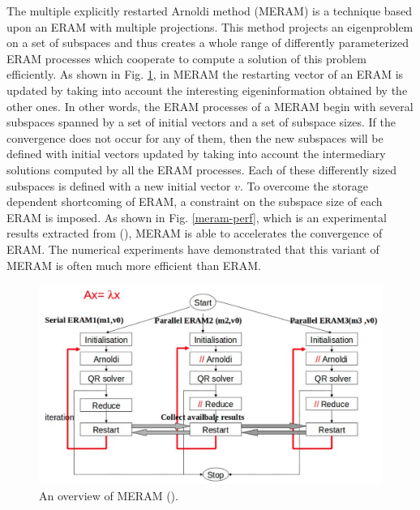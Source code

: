 The multiple explicitly restarted Arnoldi method (MERAM) is a technique based upon an ERAM with multiple projections. This method projects an eigenproblem on a set of subspaces and thus creates a whole range of differently parameterized ERAM processes which cooperate to compute a solution of this problem efficiently. As shown in Fig. \ref{meram}, in MERAM the restarting vector of an ERAM is updated by taking into account the interesting eigeninformation obtained by the other ones. In other words, the ERAM processes of a MERAM begin with several subspaces spanned by a set of initial vectors and a set of subspace sizes. If the convergence does not occur for any of them, then the new subspaces will be defined with initial vectors updated by taking into account the intermediary solutions computed by all the ERAM processes. Each of these differently sized subspaces is defined with a new initial vector $v$. To overcome the storage dependent shortcoming of ERAM, a constraint on the subspace size of each ERAM is imposed. As shown in Fig. \ref{meram-perf}, which is an experimental results extracted from (\cite{emad2005multiple}), MERAM is able to accelerates the convergence of ERAM. The numerical experiments have demonstrated that this variant of MERAM is often much more efficient than ERAM. 

\begin{figure}[htbp]
	\centering
	\includegraphics[width=6.3in]{fig/meram.png}
	\caption{An overview of MERAM (\cite{emad2005multiple}).}
	\label{meram}
\end{figure}

